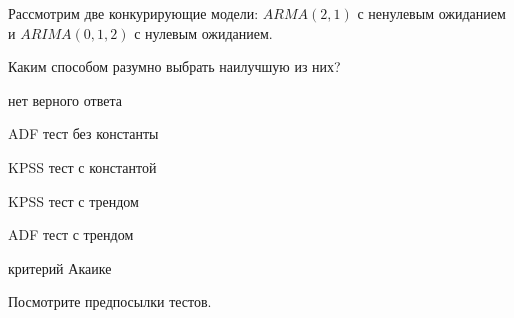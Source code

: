 
\begin{question}
Рассмотрим две конкурирующие модели: \(ARMA(2, 1)\) с ненулевым ожиданием
и \(ARIMA(0, 1, 2)\) с нулевым ожиданием.

Каким способом разумно выбрать наилучшую из них?
\begin{answerlist}
  \item нет верного ответа
  \item ADF тест без константы
  \item KPSS тест с константой
  \item KPSS тест с трендом
  \item ADF тест с трендом
  \item критерий Акаике
\end{answerlist}
\end{question}

\begin{solution}
Посмотрите предпосылки тестов.
\end{solution}

